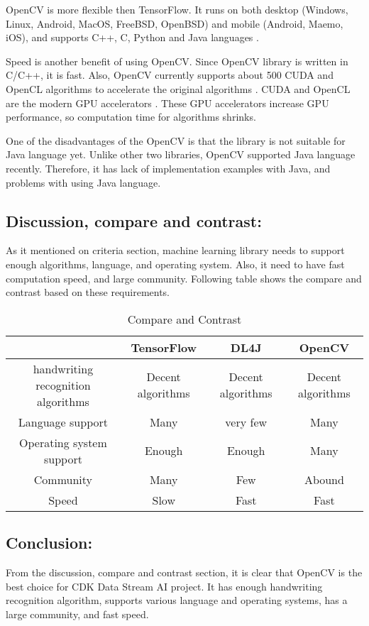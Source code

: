 \documentclass[onecolumn, draftclsnofoot,10pt, compsoc]{IEEEtran}
\begin{document}
OpenCV is more flexible then TensorFlow. It runs on both desktop (Windows, Linux, Android, MacOS, FreeBSD, OpenBSD) and mobile (Android, Maemo, iOS), and supports C++, C, Python and Java languages \cite{OCV}.

Speed is another benefit of using OpenCV. Since OpenCV library is written in C/C++, it is fast. Also, OpenCV currently supports about 500 CUDA and OpenCL algorithms to accelerate the original algorithms \cite{OCV}. CUDA and OpenCL are the modern GPU accelerators \cite{OCV}. These GPU accelerators increase GPU performance, so computation time for algorithms shrinks.

One of the disadvantages of the OpenCV is that the library is not suitable for Java language yet. Unlike other two libraries, OpenCV supported Java language recently. Therefore, it has lack of implementation examples with Java, and problems with using Java language.


\subsection{Discussion, compare and contrast:}
As it mentioned on criteria section, machine learning library needs to support enough algorithms, language, and operating system. Also, it need to have fast computation speed, and large community. Following table shows the compare and contrast based on these requirements.

\begin{table}[h]
\centering
\begin{tabular}{ | c | c | c | c |}
\hline
 & TensorFlow & DL4J & OpenCV\\ 
\hline
handwriting recognition algorithms & Decent algorithms & Decent algorithms & Decent algorithms \\ 
\hline
Language support & Many & very few & Many\\ 
\hline
Operating system support & Enough & Enough & Many\\ 
\hline
Community & Many & Few & Abound\\ 
\hline  
Speed & Slow & Fast & Fast\\ 
\hline  
\end{tabular}
\caption{Compare and Contrast}
\label{table:1}
\end{table}

\subsection{Conclusion:}
From the discussion, compare and contrast section, it is clear that OpenCV is the best choice for CDK Data Stream AI project. It has enough handwriting recognition algorithm, supports various language and operating systems, has a large community, and fast speed.
\end{document}
